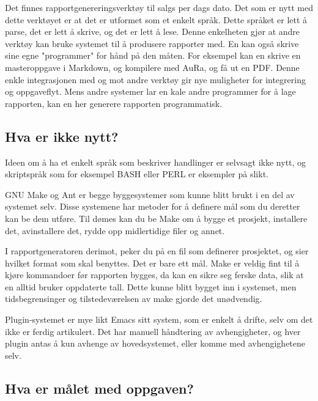 \documentclass[11pt]{article}
\begin{document}
Det finnes rapportgenereringsverktøy til salgs per dags dato. Det som er nytt med dette verktøyet er at det er utformet som et enkelt språk. Dette språket er lett å parse, det er lett å skrive, og det er lett å lese. Denne enkelheten gjør at andre verktøy kan bruke systemet til å produsere rapporter med. En kan også skrive sine egne "programmer" for hånd på den måten. For eksempel kan en skrive en masteroppgave i Markdown, og kompilere med AuRa, og få ut en PDF. Denne enkle integrasjonen med og mot andre verktøy gir nye muligheter for integrering og oppgaveflyt. Mens andre systemer lar en kale andre programmer for å lage rapporten, kan en her generere rapporten programmatisk.



\subsection{Hva er ikke nytt?}



Ideen om å ha et enkelt språk som beskriver handlinger er selvsagt ikke nytt, og skriptspråk som for eksempel BASH eller PERL er eksempler på slikt.



GNU Make og Ant er begge byggesystemer som kunne blitt brukt i en del av systemet selv. Disse systemene har metoder for å definere mål som du deretter kan be dem utføre. Til dømes kan du be Make om å bygge et prosjekt, installere det, avinstallere det, rydde opp midlertidige filer og annet.



I rapportgeneratoren derimot, peker du på en fil som definerer prosjektet, og sier hvilket format som skal benyttes. Det er bare ett mål.
Make er veldig fint til å kjøre kommandoer før rapporten bygges, da kan en sikre seg ferske data, slik at en alltid bruker oppdaterte tall.
Dette kunne blitt bygget inn i systemet, men tidsbegrensinger og tilstedeværelsen av make gjorde det unødvendig.



Plugin-systemet er mye likt Emacs sitt system, som er enkelt å drifte, selv om det ikke er ferdig artikulert. Det har manuell håndtering av avhengigheter, og hver plugin antas å kun avhenge av hovedsystemet, eller komme med avhengighetene selv.



\subsection{Hva er målet med oppgaven?}
\end{document}
